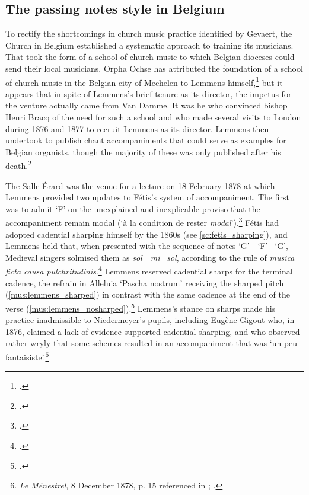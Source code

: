 \subsection{The passing notes style in Belgium}
\label{hl:lemmens_passingnotes}%
To rectify the shortcomings in church music practice identified by Gevaert, the Church in Belgium established a systematic approach to training its musicians.
That took the form of a school of church music to which Belgian dioceses could send their local musicians.
Orpha Ochse has attributed the foundation of a school of church music in the Belgian city of Mechelen to Lemmens himself,\footcite[171]{OchseOrganistsOrganPlaying2000} but it appears that in spite of Lemmens's brief tenure as its director, the impetus for the venture actually came from Van Damme.
It was he who convinced bishop Henri Bracq of the need for such a school and who made several visits to London during 1876 and 1877 to recruit Lemmens as its director.
Lemmens then undertook to publish chant accompaniments that could serve as examples for Belgian organists, though the majority of these was only published after his death.\footcite[Joseph Duclos, `Essai sur la vie et les travaux de Lemmens' in][p. xxix]{Lemmenschantgregoriensa1886}

\label{ln:lemmens_update}%
The Salle Érard was the venue for a lecture on 18 February 1878 at which Lemmens provided two updates to Fétis's system of accompaniment.
The first was to admit `F'\kern 1pt\sharp{} on the unexplained and inexplicable proviso that the accompaniment remain modal (`à la condition de rester \emph{modal}').\footcite[58]{Bourgault-Ducoudraynouveausystemepour1878}
Fétis had adopted cadential sharping himself by the 1860s (see \cref{sc:fetis_sharping}), and Lemmens held that, when presented with the sequence of notes `G'~\rightarrow{}~`F'~\rightarrow{} `G', Medieval singers solmised them as \emph{sol}~\rightarrow{}~\emph{mi}~\rightarrow{} \emph{sol}, according to the rule of \emph{musica ficta causa pulchritudinis}.\footcites[3, 45--6]{Lemmenschantgregoriensa1886}
Lemmens reserved cadential sharps for the terminal cadence, the refrain in Alleluia `Pascha nostrum' receiving the sharped pitch (\cref{mus:lemmens_sharped}) in contrast with the same cadence at the end of the verse (\cref{mus:lemmens_nosharped}).\footcite[16--17]{LemmensChantsliturgiques1884}
Lemmens's stance on sharps made his practice inadmissible to Niedermeyer's pupils, including Eugène Gigout who, in 1876, claimed a lack of evidence supported cadential sharping, and who observed rather wryly that some schemes resulted in an accompaniment that was `un peu fantaisiste'.\footnote{\emph{Le Ménestrel}, 8 December 1878, p. 15 referenced in \cite[181--2]{OchseOrganistsOrganPlaying2000}; \cite[19]{GigoutPartiepratique1876}.}

